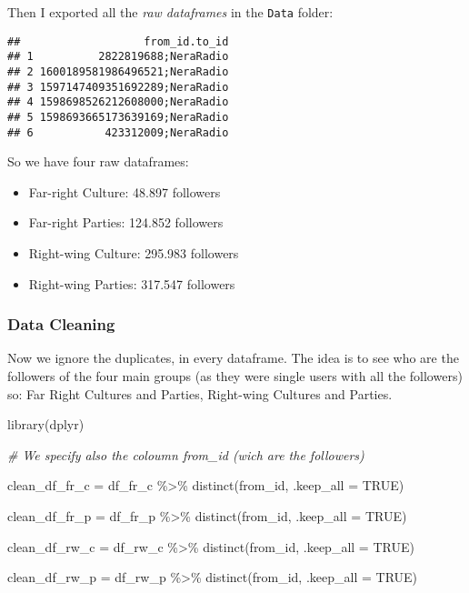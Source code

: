 \documentclass[
]{article}
\newenvironment{Shaded}{\begin{snugshade}}{\end{snugshade}}
\newcommand{\AttributeTok}[1]{\textcolor[rgb]{0.77,0.63,0.00}{#1}}
\newcommand{\CommentTok}[1]{\textcolor[rgb]{0.56,0.35,0.01}{\textit{#1}}}
\newcommand{\ConstantTok}[1]{\textcolor[rgb]{0.00,0.00,0.00}{#1}}
\newcommand{\FunctionTok}[1]{\textcolor[rgb]{0.00,0.00,0.00}{#1}}
\newcommand{\NormalTok}[1]{#1}
\newcommand{\OtherTok}[1]{\textcolor[rgb]{0.56,0.35,0.01}{#1}}
\newcommand{\SpecialCharTok}[1]{\textcolor[rgb]{0.00,0.00,0.00}{#1}}
\providecommand{\tightlist}{%
  \setlength{\itemsep}{0pt}\setlength{\parskip}{0pt}}
\begin{document}
Then I exported all the \emph{raw dataframes} in the \texttt{Data}
folder:

\begin{verbatim}
##                   from_id.to_id
## 1          2822819688;NeraRadio
## 2 1600189581986496521;NeraRadio
## 3 1597147409351692289;NeraRadio
## 4 1598698526212608000;NeraRadio
## 5 1598693665173639169;NeraRadio
## 6           423312009;NeraRadio
\end{verbatim}

So we have four raw dataframes:

\begin{itemize}
\tightlist
\item
  Far-right Culture: 48.897 followers
\item
  Far-right Parties: 124.852 followers
\item
  Right-wing Culture: 295.983 followers
\item
  Right-wing Parties: 317.547 followers
\end{itemize}

\hypertarget{data-cleaning}{%
\subsubsection{Data Cleaning}\label{data-cleaning}}

Now we ignore the duplicates, in every dataframe. The idea is to see who
are the followers of the four main groups (as they were single users
with all the followers) so: Far Right Cultures and Parties, Right-wing
Cultures and Parties.

\begin{Shaded}
\begin{Highlighting}[]
\FunctionTok{library}\NormalTok{(dplyr)}

\CommentTok{\# We specify also the coloumn from\_id (wich are the followers)}

\NormalTok{clean\_df\_fr\_c }\OtherTok{=}\NormalTok{ df\_fr\_c }\SpecialCharTok{\%\textgreater{}\%} \FunctionTok{distinct}\NormalTok{(from\_id, }\AttributeTok{.keep\_all =} \ConstantTok{TRUE}\NormalTok{)}

\NormalTok{clean\_df\_fr\_p }\OtherTok{=}\NormalTok{ df\_fr\_p }\SpecialCharTok{\%\textgreater{}\%} \FunctionTok{distinct}\NormalTok{(from\_id, }\AttributeTok{.keep\_all =} \ConstantTok{TRUE}\NormalTok{)}

\NormalTok{clean\_df\_rw\_c }\OtherTok{=}\NormalTok{ df\_rw\_c }\SpecialCharTok{\%\textgreater{}\%} \FunctionTok{distinct}\NormalTok{(from\_id, }\AttributeTok{.keep\_all =} \ConstantTok{TRUE}\NormalTok{)}

\NormalTok{clean\_df\_rw\_p }\OtherTok{=}\NormalTok{ df\_rw\_p }\SpecialCharTok{\%\textgreater{}\%} \FunctionTok{distinct}\NormalTok{(from\_id, }\AttributeTok{.keep\_all =} \ConstantTok{TRUE}\NormalTok{)}
\end{Highlighting}
\end{Shaded}
\end{document}
